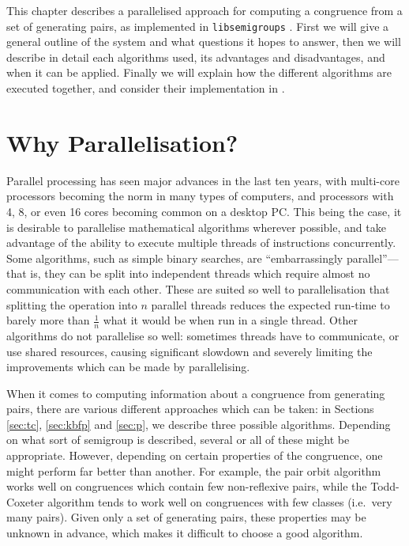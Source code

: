 This chapter describes a parallelised approach for computing a congruence from a
set of generating pairs, as implemented in \texttt{libsemigroups}
\cite{libsemigroups}.  First we will give a general outline of the system
and what questions it hopes to answer, then we will describe in detail each
algorithms used, its advantages and disadvantages, and when it can be applied.
Finally we will explain how the different algorithms are executed together, and
consider their implementation in \cite{libsemigroups}.

\section{Why Parallelisation?}

Parallel processing has seen major advances in the last ten years, with
multi-core processors becoming the norm in many types of computers, and
processors with 4, 8, or even 16 cores becoming common on a desktop PC.  This
being the case, it is desirable to parallelise mathematical algorithms wherever
possible, and take advantage of the ability to execute multiple
threads of instructions concurrently.  Some algorithms, such as simple binary
searches, are ``embarrassingly parallel''---that is, they can be split into
independent threads which require almost no communication with each other.
These are suited so well to parallelisation that splitting the operation into
$n$ parallel threads reduces the expected run-time to barely more than
$\frac{1}{n}$ what it would be when run in a single thread.  Other
algorithms do not parallelise so well: sometimes threads have to communicate, or
use shared resources, causing significant slowdown and severely limiting the
improvements which can be made by parallelising.

When it comes to computing information about a congruence from generating pairs,
there are various different approaches which can be taken: in Sections
\ref{sec:tc}, \ref{sec:kbfp} and \ref{sec:p}, we describe three
possible algorithms.  Depending on what sort of semigroup is described, several
or all of these might be appropriate.  However, depending on certain properties
of the congruence, one might perform far better than another.  For example, the
pair orbit algorithm works well on congruences which contain few non-reflexive
pairs, while the Todd-Coxeter algorithm tends to work well on congruences with
few classes (i.e.~very many pairs).  Given only a set of generating pairs, these
properties may be unknown in advance, which makes it difficult to choose a good
algorithm.

